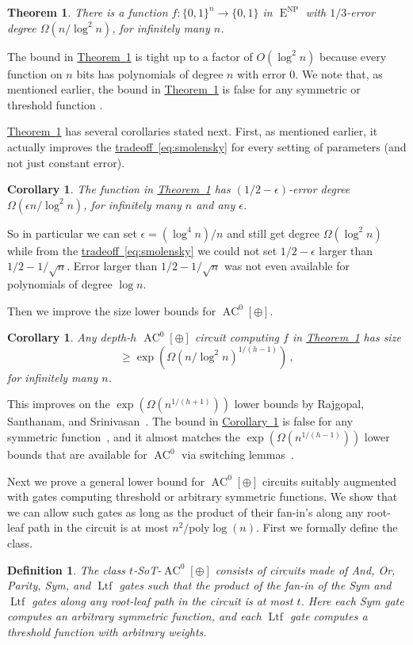 \documentclass[11pt]{article}
\newcommand{\expref}[2]{\texorpdfstring{\hyperref[#2]{#1~\ref{#2}}}{#1~\ref{#2}}}
\newcommand{\expeqref}[2]{\texorpdfstring{\hyperref[#2]{#1~\eqref{#2}}}{#1~\eqref{#2}}}
\newtheorem{thm}[theorem]{Theorem}
\newtheorem{cor}[theorem]{Corollary}
\newtheorem{defn}[theorem]{Definition}
\DeclareMathOperator{\Ltf}{\mathrm{Ltf}}  %
\DeclareMathOperator{\AC}{\mathrm{AC}}  %
\DeclareMathOperator{\NP}{\mathrm{NP}}  %
\DeclareMathOperator{\EEE}{\mathrm{E}}  %
\newcommand{\zo}{\{0, 1\}}
\newcommand{\poly}{\mathrm{poly}}
\newcommand{\e}{\epsilon}
\begin{document}
\begin{thm}
\label{thm:prob-degree-lower-bound}There is a function $f:\zo^{n}\to\zo$
in $\EEE^{\NP}$ with $1/3$-error degree $\Omega(n/\log^{2}n)$, for
infinitely many $n$.
\end{thm}


The bound in \expref{Theorem}{thm:prob-degree-lower-bound} is tight up
to a factor of $O(\log^{2}n)$ because every function on $n$ bits
has polynomials of degree $n$ with error $0$. We note that, as mentioned
earlier, the bound in \expref{Theorem}{thm:prob-degree-lower-bound} is
false for any symmetric or threshold function
\cite{DBLP:conf/fsttcs/Srinivasan13,DBLP:conf/focs/AlmanW15}.

\expref{Theorem}{thm:prob-degree-lower-bound} has several corollaries
stated next. First, as mentioned earlier, it actually improves the
\expeqref{tradeoff}{eq:smolensky} for every setting of parameters (and
not just constant error).
\begin{cor}
\label{cor:tradeoff}The function in \expref{Theorem}{thm:prob-degree-lower-bound}
has $(1/2-\e)$-error degree $\Omega(\e n/\log^{2}n)$, for infinitely
many $n$ and any $\e$.
\end{cor}

So in particular we can set $\e=(\log^{4}n)/n$ and still get degree
%
$\Omega(\log^{2}n)$ while  %
from the \expeqref{tradeoff}{eq:smolensky}
we could not set $1/2-\e$ larger than $1/2-1/\sqrt{n}$. Error larger
than $1/2-1/\sqrt{n}$ was not even available for polynomials of degree
$\log n$.

%

Then we improve the size lower bounds for $\AC^{0}[\oplus]$.
\begin{cor}          %
\label{cor:size}Any depth-$h$ $\AC^{0}[\oplus]$ circuit computing
$f$ in \expref{Theorem}{thm:prob-degree-lower-bound} has size
%
%
\[ \ge\exp(\Omega(n/\log^{2}n)^{1/(h-1)})\,, \]  %
for infinitely many $n$.
\end{cor}

This improves on the $\exp(\Omega(n^{1/(h+1)}))$ lower bounds
%
%
by Rajgopal, Santhanam, and Srinivasan~\cite{DBLP:conf/mfcs/RajgopalS018}.
The bound in \expref{Corollary}{cor:size} is false for any symmetric
function~\cite{DBLP:conf/coco/OliveiraS019}, and it almost matches
the $\exp(\Omega(n^{1/(h-1)}))$ lower bounds that are available for
$\AC^{0}$ via switching lemmas~\cite{Has87}.

Next we prove a general lower bound for $\AC^{0}[\oplus]$ circuits
suitably augmented with gates computing threshold or arbitrary symmetric
functions. We show that we can allow such gates as long as the product
of their fan-in's along any root-leaf path in the circuit is at most
%
$n^{2}/\poly\log(n)$.   %
First we formally define the class.
\begin{defn}
The class $t$-SoT-$\AC^{0}[\oplus]$ consists of circuits made of
And, Or, Parity, Sym, and $\Ltf$ gates such that the product of the fan-in
of the Sym and $\Ltf$ gates along any root-leaf path in the circuit is
at most $t$. Here each Sym gate computes an arbitrary symmetric function,
and each $\Ltf$ gate computes a threshold function with arbitrary weights.
\end{defn}
\end{document}
